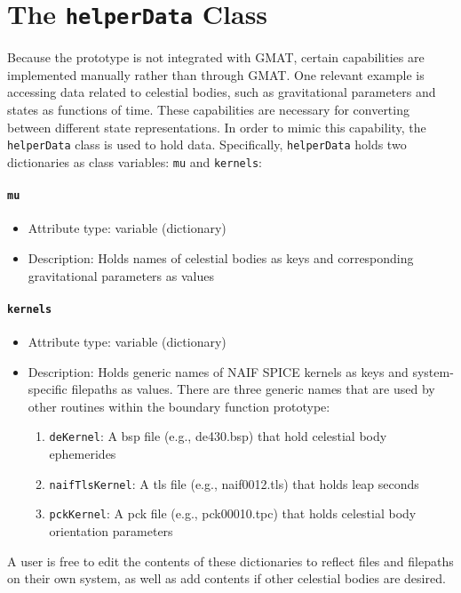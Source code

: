 \documentclass[]{article}
\begin{document}
\section{The \texttt{helperData} Class}

Because the prototype is not integrated with GMAT, certain capabilities are implemented manually rather than through GMAT. One relevant example is accessing data related to celestial bodies, such as gravitational parameters and states as functions of time. These capabilities are necessary for converting between different state representations. In order to mimic this capability, the \texttt{helperData} class is used to hold data. Specifically, \texttt{helperData} holds two dictionaries as class variables: \texttt{mu} and \texttt{kernels}:

\paragraph{\texttt{mu}}

\begin{itemize}
	\item Attribute type: variable (dictionary)
	\item Description: Holds names of celestial bodies as keys and corresponding gravitational parameters as values
\end{itemize}

\paragraph{\texttt{kernels}}

\begin{itemize}
	\item Attribute type: variable (dictionary)
	\item Description: Holds generic names of NAIF SPICE kernels as keys and system-specific filepaths as values. There are three generic names that are used by other routines within the boundary function prototype:
	\begin{enumerate}
		\item \texttt{deKernel}: A bsp file (e.g., de430.bsp) that hold celestial body ephemerides
		\item \texttt{naifTlsKernel}: A tls file (e.g., naif0012.tls) that holds leap seconds
		\item \texttt{pckKernel}: A pck file (e.g., pck00010.tpc) that holds celestial body orientation parameters
	\end{enumerate}
\end{itemize}

A user is free to edit the contents of these dictionaries to reflect files and filepaths on their own system, as well as add contents if other celestial bodies are desired.
\end{document}
